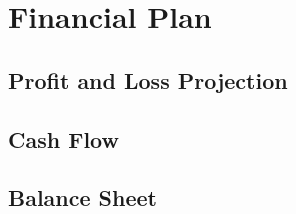 \section{Financial Plan}
\subsection{Profit and Loss Projection}

\newpage
\subsection{Cash Flow}

\newpage
\subsection{Balance Sheet}

